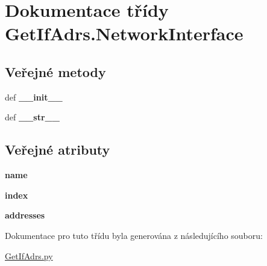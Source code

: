 \hypertarget{classGetIfAdrs_1_1NetworkInterface}{\section{Dokumentace třídy Get\-If\-Adrs.\-Network\-Interface}
\label{de/dfb/classGetIfAdrs_1_1NetworkInterface}
}
\subsection*{Veřejné metody}
\begin{DoxyCompactItemize}
\item 
\hypertarget{classGetIfAdrs_1_1NetworkInterface_a17045f163f7ea32f84f071a8fe4dc3da}{def {\bfseries \-\_\-\-\_\-init\-\_\-\-\_\-}}\label{de/dfb/classGetIfAdrs_1_1NetworkInterface_a17045f163f7ea32f84f071a8fe4dc3da}

\item 
\hypertarget{classGetIfAdrs_1_1NetworkInterface_af59ddf271fff23f70f0c12c0b7d238f7}{def {\bfseries \-\_\-\-\_\-str\-\_\-\-\_\-}}\label{de/dfb/classGetIfAdrs_1_1NetworkInterface_af59ddf271fff23f70f0c12c0b7d238f7}

\end{DoxyCompactItemize}
\subsection*{Veřejné atributy}
\begin{DoxyCompactItemize}
\item 
\hypertarget{classGetIfAdrs_1_1NetworkInterface_a2fa8fcd730a3938dd975fa9813d42a52}{{\bfseries name}}\label{de/dfb/classGetIfAdrs_1_1NetworkInterface_a2fa8fcd730a3938dd975fa9813d42a52}

\item 
\hypertarget{classGetIfAdrs_1_1NetworkInterface_a8985b52d915325de89e92b00b4110cd8}{{\bfseries index}}\label{de/dfb/classGetIfAdrs_1_1NetworkInterface_a8985b52d915325de89e92b00b4110cd8}

\item 
\hypertarget{classGetIfAdrs_1_1NetworkInterface_a2977c15005219565e7ace281fce740e5}{{\bfseries addresses}}\label{de/dfb/classGetIfAdrs_1_1NetworkInterface_a2977c15005219565e7ace281fce740e5}

\end{DoxyCompactItemize}


Dokumentace pro tuto třídu byla generována z následujícího souboru\-:\begin{DoxyCompactItemize}
\item 
\hyperlink{GetIfAdrs_8py}{Get\-If\-Adrs.\-py}\end{DoxyCompactItemize}

